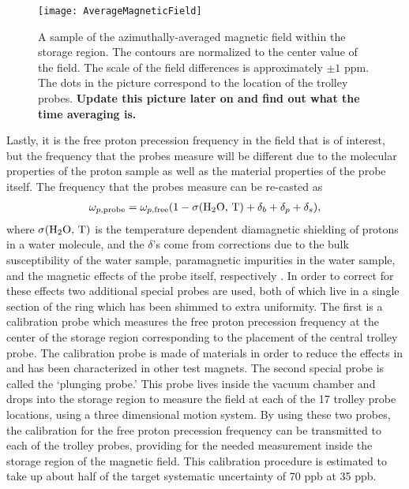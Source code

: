 \begin{figure}[]
    \centering
    \texttt{[image: AverageMagneticField]}
    \caption[Azimuthally averaged magnetic field sample]{A sample of the azimuthally-averaged magnetic field within the storage region. The contours are normalized to the center value of the field. The scale of the field differences is approximately $\pm 1$ ppm. The dots in the picture correspond to the location of the trolley probes. \textbf{Update this picture later on and find out what the time averaging is.}}
    \label{fig:AverageMagneticField}
\end{figure}


Lastly, it is the free proton precession frequency in the field that is of interest, but the frequency that the probes measure will be different due to the molecular properties of the proton sample as well as the material properties of the probe itself. The frequency that the probes measure can be re-casted as 
        \begin{align} \label{eq:wpprobe}
            \omega_{p,\text{probe}} = \omega_{p,\text{free}}(1 - \sigma(\text{H\textsubscript{2}O, T}) + \delta_{b} + \delta_{p} + \delta_{s}),
        \end{align}
where $\sigma(\text{H\textsubscript{2}O, T})$ is the temperature dependent diamagnetic shielding of protons in a water molecule, and the $\delta$'s come from corrections due to the bulk susceptibility of the water sample, paramagnetic impurities in the water sample, and the magnetic effects of the probe itself, respectively \cite{TDR}. In order to correct for these effects two additional special probes are used, both of which live in a single section of the ring which has been shimmed to extra uniformity. The first is a calibration probe which measures the free proton precession frequency at the center of the storage region corresponding to the placement of the central trolley probe. The calibration probe is made of materials in order to reduce the effects in  and has been characterized in other test magnets. The second special probe is called the `plunging probe.' This probe lives inside the vacuum chamber and drops into the storage region to measure the field at each of the 17 trolley probe locations, using a three dimensional motion system. By using these two probes, the calibration for the free proton precession frequency can be transmitted to each of the trolley probes, providing for the needed measurement inside the storage region of the magnetic field. This calibration procedure is estimated to take up about half of the target systematic uncertainty of 70 ppb at 35 ppb.


